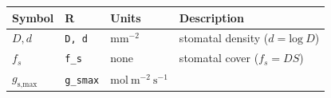 \documentclass[utf8]{frontiersSCNS}
\begin{document}
\begin{longtable}[]{@{}llll@{}}
\toprule
\begin{minipage}[b]{0.09\columnwidth}\raggedright
Symbol\strut
\end{minipage} & \begin{minipage}[b]{0.09\columnwidth}\raggedright
R\strut
\end{minipage} & \begin{minipage}[b]{0.09\columnwidth}\raggedright
Units\strut
\end{minipage} & \begin{minipage}[b]{0.61\columnwidth}\raggedright
Description\strut
\end{minipage}\tabularnewline
\midrule
\endhead
\begin{minipage}[t]{0.09\columnwidth}\raggedright
\(D,d\)\strut
\end{minipage} & \begin{minipage}[t]{0.09\columnwidth}\raggedright
\texttt{D,\ d}\strut
\end{minipage} & \begin{minipage}[t]{0.09\columnwidth}\raggedright
\(\textrm{mm}^{-2}\)\strut
\end{minipage} & \begin{minipage}[t]{0.61\columnwidth}\raggedright
stomatal density (\(d = \text{log}~D\))\strut
\end{minipage}\tabularnewline
\begin{minipage}[t]{0.09\columnwidth}\raggedright
\(f_s\)\strut
\end{minipage} & \begin{minipage}[t]{0.09\columnwidth}\raggedright
\texttt{f\_s}\strut
\end{minipage} & \begin{minipage}[t]{0.09\columnwidth}\raggedright
none\strut
\end{minipage} & \begin{minipage}[t]{0.61\columnwidth}\raggedright
stomatal cover (\(f_s = D S\))\strut
\end{minipage}\tabularnewline
\begin{minipage}[t]{0.09\columnwidth}\raggedright
\(g_\text{s,max}\)\strut
\end{minipage} & \begin{minipage}[t]{0.09\columnwidth}\raggedright
\texttt{g\_smax}\strut
\end{minipage} & \begin{minipage}[t]{0.09\columnwidth}\raggedright
\(\text{mol}~\text{m}^{-2}~\text{s}^{-1}\)\strut

\end{minipage}
\end{longtable}
\end{document}
